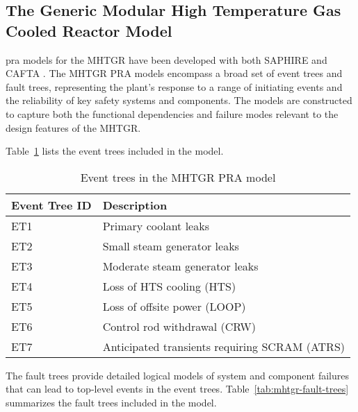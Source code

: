 \subsection{The Generic Modular High Temperature Gas Cooled Reactor Model}

\acrshort{pra} models for the MHTGR have been developed with both SAPHIRE and CAFTA \cite{hamza_openpra-orggeneric-mhtgr-model_2025}. The MHTGR PRA models encompass a broad set of event trees and fault trees, representing the plant's response to a range of initiating events and the reliability of key safety systems and components. The models are constructed to capture both the functional dependencies and failure modes relevant to the design features of the MHTGR.

Table~\ref{tab:mhtgr-event-trees} lists the event trees included in the model.

\begin{table}[H]
    \centering
    \caption{Event trees in the MHTGR PRA model}
    \label{tab:mhtgr-event-trees}
    \begin{tabular}{ll}
        \toprule
        \textbf{Event Tree ID} & \textbf{Description} \\
        \midrule
        ET1 & Primary coolant leaks \\
        ET2 & Small steam generator leaks \\
        ET3 & Moderate steam generator leaks \\
        ET4 & Loss of HTS cooling (HTS) \\
        ET5 & Loss of offsite power (LOOP) \\
        ET6 & Control rod withdrawal (CRW) \\
        ET7 & Anticipated transients requiring SCRAM (ATRS) \\
        \bottomrule
    \end{tabular}
\end{table}

The fault trees provide detailed logical models of system and component failures that can lead to top-level events in the event trees. Table~\ref{tab:mhtgr-fault-trees} summarizes the fault trees included in the model.

